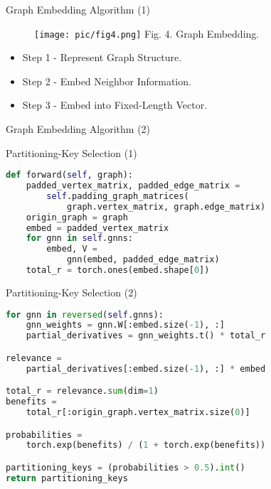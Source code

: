 \documentclass{beamer}
\begin{document}
\begin{frame}{Graph Embedding Algorithm (1)}
    \begin{minipage}{0.4\linewidth}
        \begin{figure}[htpb]
            \centering
            \texttt{[image: pic/fig4.png]}
            {Fig. 4. Graph Embedding.}
        \end{figure}
    \end{minipage}%
    \begin{minipage}{0.6\linewidth}
        \begin{itemize}
            \item Step 1 - Represent Graph Structure.
            \item Step 2 - Embed Neighbor Information.
            \item Step 3 - Embed into Fixed-Length Vector.
        \end{itemize}
    \end{minipage}
\end{frame}

\begin{frame}{Graph Embedding Algorithm (2)}

\end{frame}

\begin{frame}[fragile]{Partitioning-Key Selection (1)}
    \begin{minipage}{1.045\linewidth}
\begin{lstlisting}[language=Python]
def forward(self, graph):
    padded_vertex_matrix, padded_edge_matrix = 
        self.padding_graph_matrices(
            graph.vertex_matrix, graph.edge_matrix)
    origin_graph = graph
    embed = padded_vertex_matrix
    for gnn in self.gnns:
        embed, V =
            gnn(embed, padded_edge_matrix)
    total_r = torch.ones(embed.shape[0])
\end{lstlisting}
    \end{minipage}
\end{frame} 

\begin{frame}[fragile]{Partitioning-Key Selection (2)}
    \begin{minipage}{1.045\linewidth}
\begin{lstlisting}[language=python]
for gnn in reversed(self.gnns):
    gnn_weights = gnn.W[:embed.size(-1), :]
    partial_derivatives = gnn_weights.t() * total_r

relevance =
    partial_derivatives[:embed.size(-1), :] * embed

total_r = relevance.sum(dim=1)
benefits =
    total_r[:origin_graph.vertex_matrix.size(0)]

probabilities =
    torch.exp(benefits) / (1 + torch.exp(benefits))

partitioning_keys = (probabilities > 0.5).int()
return partitioning_keys
\end{lstlisting}
    \end{minipage}
\end{frame}
\end{document}
